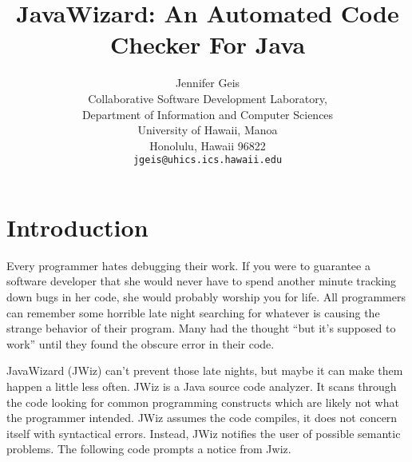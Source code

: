 

\setcounter{secnumdepth}{6}
\setcounter{tocdepth}{6}



\title{JavaWizard: An Automated Code Checker For Java} \author{Jennifer
  Geis\\ Collaborative Software Development Laboratory,\\ Department of
  Information and Computer Sciences\\ University of Hawaii, Manoa\\ 
  Honolulu, Hawaii 96822\\ {\tt jgeis@uhics.ics.hawaii.edu}} \maketitle

\tableofcontents


\chapter{Introduction}
Every programmer hates debugging their work.  If you were to guarantee a
software developer that she would never have to spend another minute
tracking down bugs in her code, she would probably worship you for life.
All programmers can remember some horrible late night searching for
whatever is causing the strange behavior of their program.  Many had the
thought ``but it's supposed to work'' until they found the obscure error in
their code.

JavaWizard (JWiz) can't prevent those late nights, but maybe it can make
them happen a little less often.  JWiz is a Java source code analyzer.  It
scans through the code looking for common programming constructs which are
likely not what the programmer intended.  JWiz assumes the code compiles,
it does not concern itself with syntactical errors.  Instead, JWiz notifies
the user of possible semantic problems.  The following code prompts a
notice from Jwiz.

